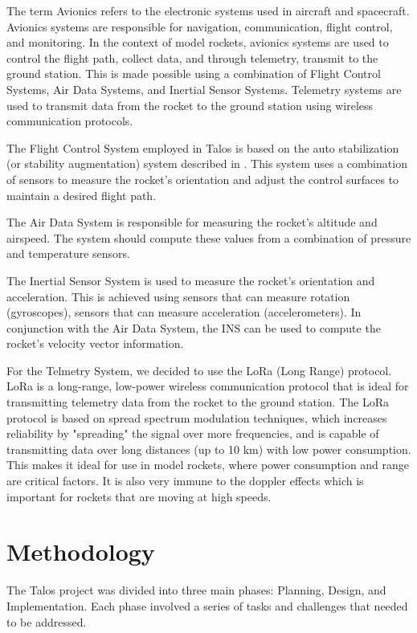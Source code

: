 \documentclass{article}
\begin{document}
The term Avionics refers to the electronic systems used in aircraft and spacecraft. Avionics systems are responsible for navigation, communication, flight control, and monitoring. In the context of model rockets, avionics systems are used to control the flight path, collect data, and through telemetry, transmit to the ground station. This is made possible using a combination of Flight Control Systems, Air Data Systems, and Inertial Sensor Systems. Telemetry systems are used to transmit data from the rocket to the ground station using wireless communication protocols.


The Flight Control System employed in Talos is based on the auto stabilization (or stability augmentation) system described in \cite{Collinson_2012}. This system uses a combination of sensors to measure the rocket's orientation and adjust the control surfaces to maintain a desired flight path.


The Air Data System is responsible for measuring the rocket's altitude and airspeed. The system should compute these values from a combination of pressure and temperature sensors.

The Inertial Sensor System is used to measure the rocket's orientation and acceleration. This is achieved using sensors that can measure rotation (gyroscopes), sensors that can measure acceleration (accelerometers). In conjunction with the Air Data System, the INS can be used to compute the rocket's velocity vector information.

For the Telmetry System, we decided to use the LoRa (Long Range) protocol. LoRa is a long-range, low-power wireless communication protocol that is ideal for transmitting telemetry data from the rocket to the ground station. The LoRa protocol is based on spread spectrum modulation techniques, which increases reliability by "spreading" the signal over more frequencies, and is capable of transmitting data over long distances (up to 10 km) with low power consumption. This makes it ideal for use in model rockets, where power consumption and range are critical factors. It is also very immune to the doppler effects\cite{8723123} which is important for rockets that are moving at high speeds.

\section{Methodology}

The Talos project was divided into three main phases: Planning, Design, and Implementation. Each phase involved a series of tasks and challenges that needed to be addressed.
\end{document}
